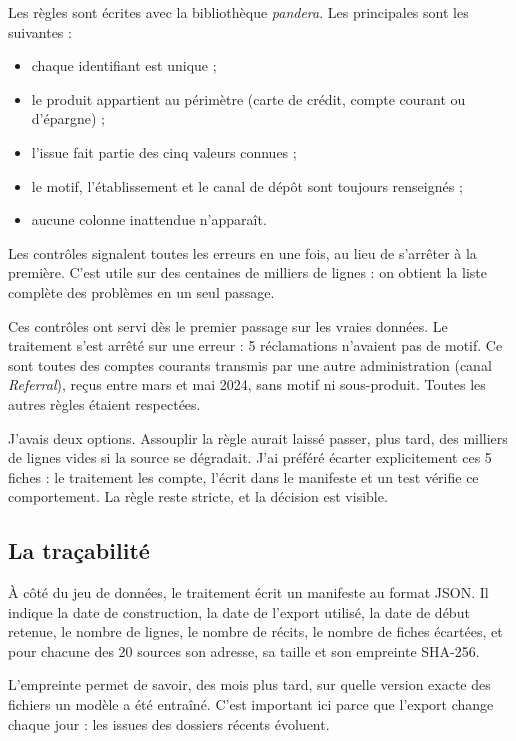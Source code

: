 \documentclass[11pt,a4paper]{article}
\begin{document}
Les règles sont écrites avec la bibliothèque \emph{pandera}. Les principales sont les suivantes :
\begin{itemize}
  \item chaque identifiant est unique ;
  \item le produit appartient au périmètre (carte de crédit, compte courant ou d'épargne) ;
  \item l'issue fait partie des cinq valeurs connues ;
  \item le motif, l'établissement et le canal de dépôt sont toujours renseignés ;
  \item aucune colonne inattendue n'apparaît.
\end{itemize}

Les contrôles signalent toutes les erreurs en une fois, au lieu de s'arrêter à la première. C'est utile sur des centaines de milliers de lignes : on obtient la liste complète des problèmes en un seul passage.

Ces contrôles ont servi dès le premier passage sur les vraies données. Le traitement s'est arrêté sur une erreur : 5 réclamations n'avaient pas de motif. Ce sont toutes des comptes courants transmis par une autre administration (canal \emph{Referral}), reçus entre mars et mai 2024, sans motif ni sous-produit. Toutes les autres règles étaient respectées.

J'avais deux options. Assouplir la règle aurait laissé passer, plus tard, des milliers de lignes vides si la source se dégradait. J'ai préféré écarter explicitement ces 5 fiches : le traitement les compte, l'écrit dans le manifeste et un test vérifie ce comportement. La règle reste stricte, et la décision est visible.


\subsection{La traçabilité}

À côté du jeu de données, le traitement écrit un manifeste au format JSON. Il indique la date de construction, la date de l'export utilisé, la date de début retenue, le nombre de lignes, le nombre de récits, le nombre de fiches écartées, et pour chacune des 20 sources son adresse, sa taille et son empreinte SHA-256.

L'empreinte permet de savoir, des mois plus tard, sur quelle version exacte des fichiers un modèle a été entraîné. C'est important ici parce que l'export change chaque jour : les issues des dossiers récents évoluent.
\end{document}
